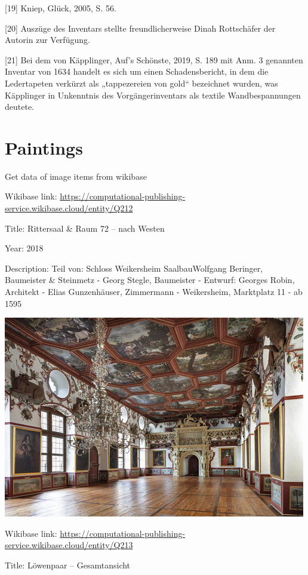 \documentclass[
  letterpaper,
]{book}
\begin{document}
{[}19{]} Kniep, Glück, 2005, S. 56.

{[}20{]} Auszüge des Inventars stellte freundlicherweise Dinah
Rottschäfer der Autorin zur Verfügung.

{[}21{]} Bei dem von Käpplinger, Auf's Schönste, 2019, S. 189 mit Anm. 3
genannten Inventar von 1634 handelt es sich um einen Schadensbericht, in
dem die Ledertapeten verkürzt als „tappezereien von gold`` bezeichnet
wurden, was Käpplinger in Unkenntnis des Vorgängerinventars als textile
Wandbespannungen deutete.


\chapter{Paintings}\label{paintings}

Get data of image items from wikibase

Wikibase link:
\url{https://computational-publishing-service.wikibase.cloud/entity/Q212}

Title: Rittersaal \& Raum 72 -- nach Westen

Year: 2018

Description: Teil von: Schloss Weikersheim SaalbauWolfgang Beringer,
Baumeister \& Steinmetz - Georg Stegle, Baumeister - Entwurf: Georges
Robin, Architekt - Elias Gunzenhäuser, Zimmermann - Weikersheim,
Marktplatz 11 - ab 1595

\includegraphics{paintings_files/figure-pdf/cell-3-output-2.png}

Wikibase link:
\url{https://computational-publishing-service.wikibase.cloud/entity/Q213}

Title: Löwenpaar -- Gesamtansicht
\end{document}
